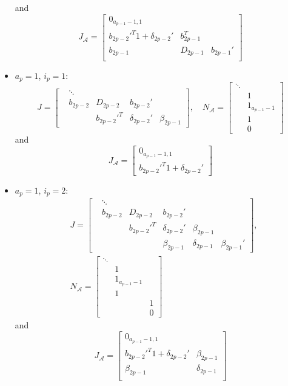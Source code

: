 \documentclass[]{article}
\newcommand{\BIN}{\begin{bmatrix}}
\newcommand{\BOUT}{\end{bmatrix}}
\begin{document}
\begin{itemize}
  and
  \begin{equation*}
    J_\mathcal{A} = \BIN 0_{a_{p-1}-1,1} & & \\ b_{2p-2}'^T 1 + \delta_{2p-2}' & b_{2p-1}^T \\ b_{2p-1} & D_{2p-1} & b_{2p-1}' \\ \BOUT
  \end{equation*}
  \item $a_p = 1$, $i_p=1$:
  \begin{equation*}
    J = \BIN & \ddots   &             &                &              \\
             & b_{2p-2} & D_{2p-2}    & b_{2p-2}'      &              \\
             &          & b_{2p-2}'^T & \delta_{2p-2}' & \beta_{2p-1} \BOUT, \quad
    N_\mathcal{A} = \BIN \ddots & \\ & 1 \\ & 1_{a_{p-1}-1} \\ & 1 \\ & 0 \BOUT
  \end{equation*}
  and
  \begin{equation*}
    J_\mathcal{A} = \BIN 0_{a_{p-1}-1,1} \\ b_{2p-2}'^T 1 + \delta_{2p-2}' \BOUT
  \end{equation*}
  \item $a_p = 1$, $i_p=2$:
  \begin{align*}
    &J = \BIN & \ddots   &             &                &               &               \\
              & b_{2p-2} & D_{2p-2}    & b_{2p-2}'      &               &               \\
              &          & b_{2p-2}'^T & \delta_{2p-2}' & \beta_{2p-1}  &               \\
              &          &             & \beta_{2p-1}   & \delta_{2p-1} & \beta_{2p-1}' \BOUT,\\
    &N_\mathcal{A} = \BIN \ddots & & \\ & 1 & \\ & 1_{a_{p-1}-1} & \\ & 1 & \\ & & 1 \\ &  & 0 \BOUT
  \end{align*}
  and
  \begin{equation*}
    J_\mathcal{A} = \BIN 0_{a_{p-1}-1,1} & \\ b_{2p-2}'^T 1 + \delta_{2p-2}' & \beta_{2p-1} \\ \beta_{2p-1} & \delta_{2p-1} \\ \BOUT

\end{equation*}
\end{itemize}
\end{document}
